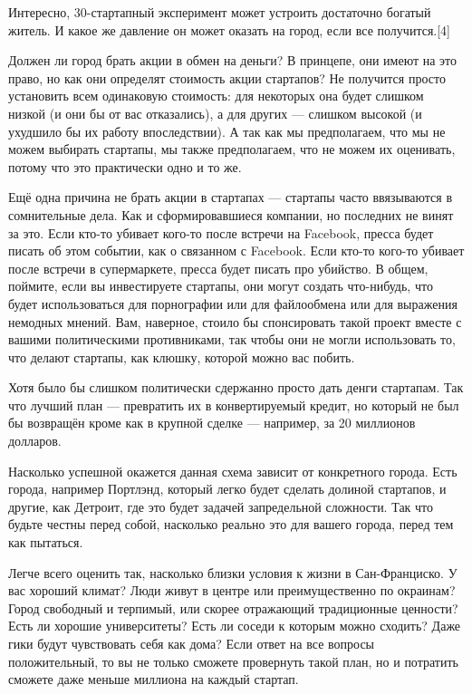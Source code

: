 \documentclass[ebook,12pt,oneside,openany]{memoir}
\begin{document}
Интересно, 30-стартапный эксперимент может устроить достаточно богатый
житель. И какое же давление он может оказать на город, если все
получится.[4]

Должен ли город брать акции в обмен на деньги? В принцепе, они имеют
на это право, но как они определят стоимость акции стартапов? Не
получится просто установить всем одинаковую стоимость: для некоторых
она будет слишком низкой (и они бы от вас отказались), а для других —
слишком высокой (и ухудшило бы их работу впоследствии). А так как мы
предполагаем, что мы не можем выбирать стартапы, мы также
предполагаем, что не можем их оценивать, потому что это практически
одно и то же.

Ещё одна причина не брать акции в стартапах — стартапы часто
ввязываются в сомнительные дела. Как и сформировавшиеся компании, но
последних не винят за это. Если кто-то убивает кого-то после встречи
на Facebook, пресса будет писать об этом событии, как о связанном с
Facebook. Если кто-то кого-то убивает после встречи в супермаркете,
пресса будет писать про убийство. В общем, поймите, если вы
инвестируете стартапы, они могут создать что-нибудь, что будет
использоваться для порнографии или для файлообмена или для выражения
немодных мнений. Вам, наверное, стоило бы спонсировать такой проект
вместе с вашими политическими противниками, так чтобы они не могли
использовать то, что делают стартапы, как клюшку, которой можно вас
побить.

Хотя было бы слишком политически сдержанно просто дать денги
стартапам. Так что лучший план — превратить их в конвертируемый
кредит, но который не был бы возвращён кроме как в крупной сделке —
например, за 20 миллионов долларов.

Насколько успешной окажется данная схема зависит от конкретного
города. Есть города, например Портлэнд, который легко будет сделать
долиной стартапов, и другие, как Детроит, где это будет задачей
запредельной сложности. Так что будьте честны перед собой, насколько
реально это для вашего города, перед тем как пытаться.

Легче всего оценить так, насколько близки условия к жизни в
Сан-Франциско. У вас хороший климат? Люди живут в центре или
преимущественно по окраинам? Город свободный и терпимый, или скорее
отражающий традиционные ценности? Есть ли хорошие университеты? Есть
ли соседи к которым можно сходить? Даже гики будут чувствовать себя
как дома? Если ответ на все вопросы положительный, то вы не только
сможете провернуть такой план, но и потратить сможете даже меньше
миллиона на каждый стартап.
\end{document}
